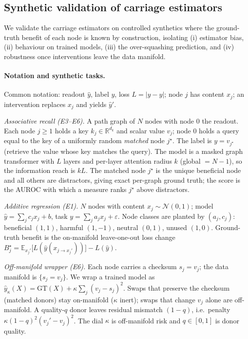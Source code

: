 \subsection{Synthetic validation of carriage estimators}
We validate the carriage estimators on controlled synthetics where the ground-truth benefit
of each node is known by construction, isolating (i) estimator bias, (ii) behaviour on trained
models, (iii) the over-squashing prediction, and (iv) robustness once interventions leave the
data manifold.

\paragraph{Notation and synthetic tasks.}
Common notation: readout $\hat y$, label $y$, loss $L=|\hat y-y|$; node $j$ has content $x_j$;
an intervention replaces $x_j$ and yields $\hat y'$.

\emph{Associative recall (E3--E6).} A path graph of $N$ nodes with node $0$ the readout. Each
node $j\!\ge\!1$ holds a key $k_j\!\in\!\mathbb{R}^{d_k}$ and scalar value $v_j$; node $0$ holds
a query equal to the key of a uniformly random \emph{matched} node $j^{\star}$. The label is
$y=v_{j^{\star}}$ (retrieve the value whose key matches the query). The model is a masked graph
transformer with $L$ layers and per-layer attention radius $k$ (global $=\!N\!-\!1$), so the
information reach is $kL$. The matched node $j^{\star}$ is the unique beneficial node and all
others are distractors, giving exact per-graph ground truth; the score is the AUROC with which a
measure ranks $j^{\star}$ above distractors.

\emph{Additive regression (E1).} $N$ nodes with content $x_j\!\sim\!\mathcal{N}(0,1)$; model
$\hat y=\sum_j c_j x_j+b$, task $y=\sum_j a_j x_j+\varepsilon$. Node classes are planted by
$(a_j,c_j)$: beneficial $(1,1)$, harmful $(1,-1)$, neutral $(0,1)$, unused $(1,0)$. Ground-truth
benefit is the on-manifold leave-one-out loss change
$B^{\star}_j=\mathbb{E}_{x_j'}\!\big[L(\hat y(x_{j\to x_j'}))\big]-L(\hat y)$.

\emph{Off-manifold wrapper (E6).} Each node carries a checksum $s_j=v_j$; the data manifold is
$\{s_j=v_j\}$. We wrap a trained model as $\hat y_\kappa(X)=\mathrm{GT}(X)+\kappa\sum_j(v_j-s_j)^2$.
Swaps that preserve the checksum (matched donors) stay on-manifold ($\kappa$ inert); swaps that
change $v_j$ alone are off-manifold. A quality-$q$ donor leaves residual mismatch $(1-q)$, i.e.\
penalty $\kappa(1-q)^2(v_j'-v_j)^2$. The dial $\kappa$ is off-manifold risk and $q\!\in\![0,1]$ is
donor quality.

